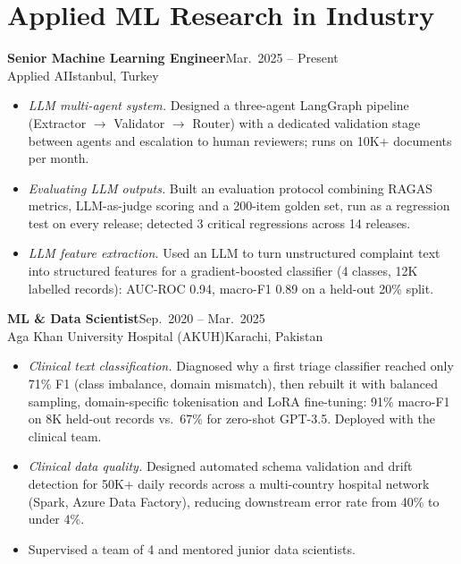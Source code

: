 \documentclass[11pt,letterpaper]{article}
\newcommand{\entry}[4]{
  \textbf{#1}\hfill #2\\
  #3\hfill #4\par\vspace{1pt}}
\begin{document}
\section{Applied ML Research in Industry}
\entry{Senior Machine Learning Engineer}{Mar.\ 2025 -- Present}
      {Applied AI}{Istanbul, Turkey}
\begin{itemize}
  \item \textit{LLM multi-agent system.} Designed a three-agent LangGraph pipeline (Extractor $\rightarrow$ Validator $\rightarrow$ Router)
        with a dedicated validation stage between agents and escalation to human reviewers; runs on 10K+ documents per month.
  \item \textit{Evaluating LLM outputs.} Built an evaluation protocol combining RAGAS metrics, LLM-as-judge scoring and a 200-item
        golden set, run as a regression test on every release; detected 3 critical regressions across 14 releases.
  \item \textit{LLM feature extraction.} Used an LLM to turn unstructured complaint text into structured features for a
        gradient-boosted classifier (4 classes, 12K labelled records): AUC-ROC 0.94, macro-F1 0.89 on a held-out 20\% split.
\end{itemize}
\vspace{2pt}
\entry{ML \& Data Scientist}{Sep.\ 2020 -- Mar.\ 2025}
      {Aga Khan University Hospital (AKUH)}{Karachi, Pakistan}
\begin{itemize}
  \item \textit{Clinical text classification.} Diagnosed why a first triage classifier reached only 71\% F1 (class imbalance,
        domain mismatch), then rebuilt it with balanced sampling, domain-specific tokenisation and LoRA fine-tuning:
        91\% macro-F1 on 8K held-out records vs.\ 67\% for zero-shot GPT-3.5. Deployed with the clinical team.
  \item \textit{Clinical data quality.} Designed automated schema validation and drift detection for 50K+ daily records across a
        multi-country hospital network (Spark, Azure Data Factory), reducing downstream error rate from 40\% to under 4\%.
  \item Supervised a team of 4 and mentored junior data scientists.
\end{itemize}
\end{document}
